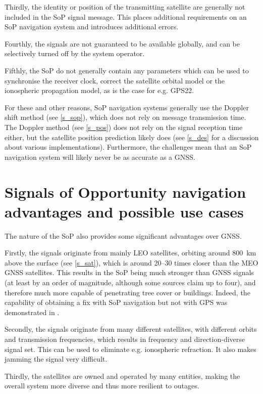 Thirdly, the identity or position of the transmitting satellite are generally not included in the SoP signal message. This places additional requirements on an SoP navigation system and introduces additional errors.

Fourthly, the signals are not guaranteed to be available globally, and can be selectively turned off by the system operator.

Fifthly, the SoP do not generally contain any parameters which can be used to synchronise the receiver clock, correct the satellite orbital model or the ionospheric propagation model, as is the case for e.g. GPS\citep{pos04}{22}.

For these and other reasons, SoP navigation systems generally use the Doppler shift method (see \autoref{s_sop}), which does not rely on message transmission time. The Doppler method (see \autoref{s_pos}) does not rely on the signal reception time either, but the satellite position prediction likely does (see \autoref{s_des} for a discussion about various implementations). Furthermore, the challenges mean that an SoP navigation system will likely never be as accurate as a GNSS.



\section{Signals of Opportunity navigation advantages and possible use cases}
\label{s_int_use_cases}
The nature of the SoP also provides some significant advantages over GNSS.

Firstly, the signals originate from mainly LEO satellites, orbiting around \qty{800}{km} above the surface (see \autoref{s_sat}), which is around \numrange{20}{30} times closer than the MEO GNSS satellites. This results in the SoP being much stronger than GNSS signals (at least by an order of magnitude, although some sources claim up to four\cite{sop08}), and therefore much more capable of penetrating tree cover or buildings. Indeed, the capability of obtaining a fix with SoP navigation but not with GPS was demonstrated in \cite{sop12}.

Secondly, the signals originate from many different satellites, with different orbits and transmission frequencies, which results in frequency and direction-diverse signal set. This can be used to eliminate e.g. ionospheric refraction. It also makes jamming the signal very difficult.

Thirdly, the satellites are owned and operated by many entities, making the overall system more diverse and thus more resilient to outages.

